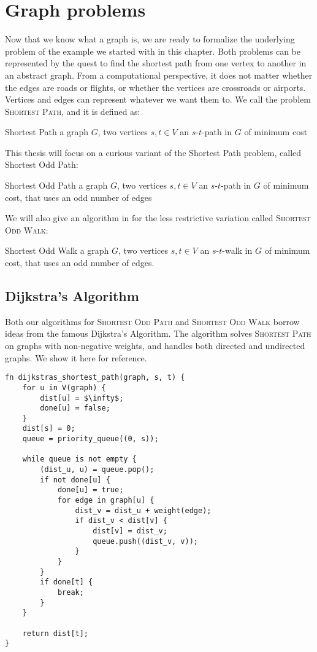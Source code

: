 \section{Graph problems}
\label{section:graph-problems}

Now that we know what a graph is, we are ready to formalize the underlying problem of the example we started with in this chapter. Both problems can be represented by the quest to find the shortest path from one vertex to another in an abstract graph. From a computational perspective, it does not matter whether the edges are roads or flights, or whether the vertices are crossroads or airports. Vertices and edges can represent whatever we want them to. We call the problem \textsc{Shortest Path}, and it is defined as:

\problem
{Shortest Path}
{a graph $G$, two vertices $s,t \in V$}
{an $s$-$t$-path in $G$ of minimum cost}

This thesis will focus on a curious variant of the Shortest Path problem, called Shortest Odd Path:

\problem
{Shortest Odd Path}
{a graph $G$, two vertices $s,t \in V$}
{an $s$-$t$-path in $G$ of minimum cost, that uses an odd number of edges}

We will also give an algorithm in  for the less restrictive variation called \textsc{Shortest Odd Walk}:

\problem
{Shortest Odd Walk}
{a graph $G$, two vertices $s,t \in V$}
{an $s$-$t$-walk in $G$ of minimum cost, that uses an odd number of edges.}

\subsection*{Dijkstra's Algorithm}
\label{algorithm:dijkstras-algorithm}
Both our algorithms for \textsc{Shortest Odd Path} and \textsc{Shortest Odd Walk} borrow ideas from the famous Dijkstra's Algorithm. The algorithm solves \textsc{Shortest Path} on graphs with non-negative weights, and handles both directed and undirected graphs. We show it here for reference.

\begin{lstlisting}[caption={Dijkstra's Algorithm for Shortest Path},label=Listing,mathescape=true]
fn dijkstras_shortest_path(graph, s, t) {
    for u in V(graph) {
        dist[u] = $\infty$;
        done[u] = false;
    }
    dist[s] = 0;
    queue = priority_queue((0, s));

    while queue is not empty {
        (dist_u, u) = queue.pop();
        if not done[u] {
            done[u] = true;
            for edge in graph[u] {
                dist_v = dist_u + weight(edge);
                if dist_v < dist[v] {
                    dist[v] = dist_v;
                    queue.push((dist_v, v));
                }
            }
        }
        if done[t] { 
            break; 
        }
    }

    return dist[t];
}
\end{lstlisting}
